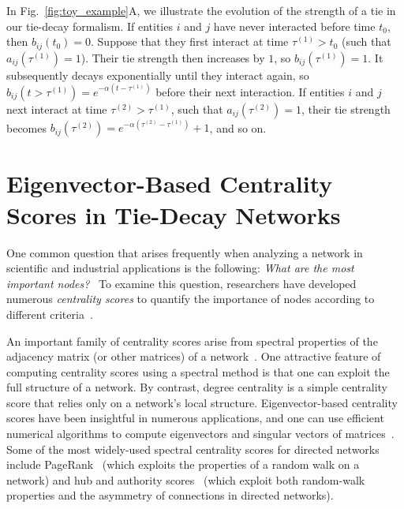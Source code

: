 \documentclass[journal,transmag]{IEEEtran}
\begin{document}
In Fig.~\ref{fig:toy_example}A, we illustrate the evolution of the strength of a tie
in our tie-decay formalism.
If entities $i$ and $j$ have never
interacted before time $t_0$, then $b_{ij}(t_0) = 0$. Suppose that
they first interact at time $\tau^{\left(1\right)} > t_0$ (such that
$a_{ij}(\tau^{\left(1\right)}) = 1$). Their tie strength then
increases by $1$, so $b_{ij}(\tau^{\left(1\right)}) = 1$. It
subsequently decays exponentially until they interact again, so $b_{ij}(t>\tau^{\left(1\right)}) =
e^{-\alpha (t - \tau^{\left(1\right)})}$ before their next interaction. If entities $i$ and $j$ next
interact at time $\tau^{\left(2\right)} > \tau^{\left(1\right)}$, such
that $a_{ij}(\tau^{\left(2\right)})=1$, their tie strength becomes
$b_{ij}(\tau^{\left(2\right)}) = e^{-\alpha (\tau^{\left(2\right)} -
  \tau^{\left(1\right)})} + 1$, and so on.


\section{Eigenvector-Based Centrality Scores in Tie-Decay Networks}
\label{evec}
%
  One common question that
arises frequently when analyzing a network in
  scientific and industrial applications is the following: {\it What
  are the most important nodes?}~\cite{Grindrod2016} To examine this
question, researchers have developed numerous {\it centrality scores}
to quantify the importance of nodes according to different
criteria~\cite{newman2010networks}.

An important family of centrality scores arise from spectral
properties of the adjacency matrix (or other matrices) of a
network~\cite{Masuda2016,Bonacich2001,Perra2008,Taylor2015}. One
attractive feature of computing centrality scores using a spectral method is that one can exploit the full structure of a network. 
By contrast, degree centrality is a simple centrality score that relies only on a network's local structure.
Eigenvector-based centrality scores have been insightful in numerous
applications, and one can use efficient numerical algorithms to
compute eigenvectors and singular vectors of
matrices~\cite{Golub1996,Trefethen1997}. Some of the most widely-used
spectral centrality scores for directed networks include
PageRank~\cite{Page1998,Gleich2015} (which exploits the properties of
a random walk on a network) and hub and authority
scores~\cite{Kleinberg1999} (which exploit both random-walk properties
and the asymmetry of connections in directed networks).
\end{document}
